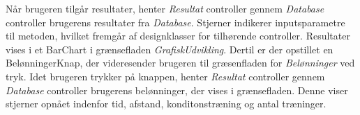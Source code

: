 \noindent 
Når brugeren tilgår resultater, henter \textit{Resultat} controller gennem \textit{Database} controller brugerens resultater fra \textit{Database}. Stjerner indikerer inputsparametre til metoden, hvilket fremgår af designklasser for tilhørende controller. Resultater vises i et BarChart i grænsefladen \textit{GrafiskUdvikling}. Dertil er der opstillet en BelønningerKnap, der videresender brugeren til græsenfladen for \textit{Belønninger} ved tryk. Idet brugeren trykker på knappen, henter \textit{Resultat} controller gennem \textit{Database} controller brugerens belønninger, der vises i grænsefladen. Denne viser stjerner opnået indenfor tid, afstand, konditonstræning og antal træninger.

